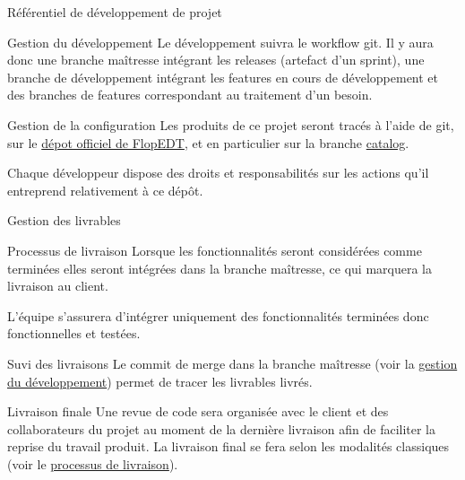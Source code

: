 \documentclass[]{article}
\begin{document}
{\begin{section}{\label{sec:Référentiel de développement de projet}Référentiel de développement de projet}
     \begin{subsection}{\label{sec:Gestion du développement}Gestion du développement}
         Le développement suivra le workflow git. Il y aura donc une branche maîtresse intégrant les releases (artefact d’un sprint), une branche de développement intégrant les features en cours de développement et des branches de features correspondant au traitement d’un besoin.
     \end{subsection}

     \begin{subsection}{\label{sec:Gestion de la configuration}Gestion de la configuration}
         Les produits de ce projet seront tracés à l'aide de git, sur le \href{https://framagit.org/flopedt/FlOpEDT}{dépot officiel de FlopEDT}, et en particulier sur la branche \href{https://framagit.org/flopedt/FlOpEDT/-/tree/catalog}{catalog}.

         Chaque développeur dispose des droits et responsabilités sur les actions qu'il entreprend relativement à ce dépôt.
     \end{subsection}

     \begin{subsection}{\label{sec:Gestion des livrables}Gestion des livrables}
         \begin{subsubsection}{\label{sec:Processus de livraison}Processus de livraison}
             Lorsque les fonctionnalités seront considérées comme terminées elles seront intégrées dans la branche maîtresse, ce qui marquera la livraison au client.

             L’équipe s’assurera d’intégrer uniquement des fonctionnalités terminées donc fonctionnelles et testées.
         \end{subsubsection}

         \begin{subsubsection}{\label{sec:Suvi des livraisons}Suvi des livraisons}
             Le commit de merge dans la branche maîtresse (voir la \hyperref[sec:Gestion du développement]{gestion du développement}) permet de tracer les livrables livrés.
         \end{subsubsection}

         \begin{subsubsection}{\label{sec:Livraison finale}Livraison finale}
             Une revue de code sera organisée avec le client et des collaborateurs du projet au moment de la dernière livraison afin de faciliter la reprise du travail produit. La livraison final se fera selon les modalités classiques (voir le \hyperref[sec:Processus de livraison]{processus de livraison}).
         \end{subsubsection}
     \end{subsection}


\end{section}}
\end{document}
